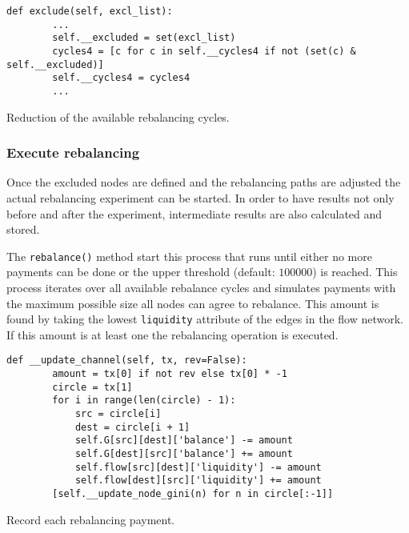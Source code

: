 \documentclass[final]{fhnwreport}       %
\begin{document}
\begin{listing}[H]
  \begin{verbatim}
def exclude(self, excl_list):
        ...
        self.__excluded = set(excl_list)
        cycles4 = [c for c in self.__cycles4 if not (set(c) & self.__excluded)]
        self.__cycles4 = cycles4
        ...
  \end{verbatim}
  \caption{Reduction of the available rebalancing cycles.}
  \label{code:reduc_cyc}
\end{listing}


\subsubsection{Execute rebalancing}
Once the excluded nodes are defined and the rebalancing paths are adjusted the actual rebalancing experiment can be started. In order to have results not only before and after the experiment, intermediate results are also calculated and stored. 

The \texttt{rebalance()} method start this process that runs until either no more payments can be done or the upper threshold (default: $100000$) is reached. This process iterates over all available rebalance cycles and simulates payments with the maximum possible size all nodes can agree to rebalance. This amount is found by taking the lowest \texttt{liquidity} attribute of the edges in the flow network. If this amount is at least one the rebalancing operation is executed. 

\begin{listing}[H]
  \begin{verbatim}
def __update_channel(self, tx, rev=False):
        amount = tx[0] if not rev else tx[0] * -1
        circle = tx[1]
        for i in range(len(circle) - 1):
            src = circle[i]
            dest = circle[i + 1]
            self.G[src][dest]['balance'] -= amount
            self.G[dest][src]['balance'] += amount
            self.flow[src][dest]['liquidity'] -= amount
            self.flow[dest][src]['liquidity'] += amount
        [self.__update_node_gini(n) for n in circle[:-1]]
  \end{verbatim}
  \caption{Record each rebalancing payment.}
  \label{code:record}
\end{listing}
\end{document}
